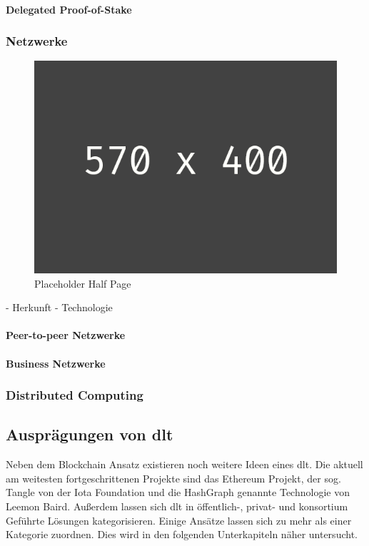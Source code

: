 \paragraph{Delegated Proof-of-Stake}


\subsubsection{Netzwerke}
\begin{figure}[h!]
	\centering
	\includegraphics[width=1.0\linewidth]{pictures/placeholder_half_page}
	\caption[Placeholder Half Page]{Placeholder Half Page}
	\label{fig:placeholder_half_page}
\end{figure}
- Herkunft
- Technologie

\paragraph{Peer-to-peer Netzwerke}

\paragraph{Business Netzwerke}

\subsubsection{Distributed Computing}


\subsection{Ausprägungen von \acl{dlt}}
Neben dem Blockchain Ansatz existieren noch weitere Ideen eines \ac{dlt}. Die aktuell am weitesten fortgeschrittenen Projekte sind das Ethereum Projekt, der sog. \glqq Tangle\grqq{} von der Iota Foundation und die \glqq HashGraph\grqq{} genannte Technologie von Leemon Baird.\cite{Baird2016} Außerdem lassen sich \ac{dlt} in öffentlich-, privat- und konsortium Geführte Lösungen kategorisieren. Einige Ansätze lassen sich zu mehr als einer Kategorie zuordnen. Dies wird in den folgenden Unterkapiteln näher untersucht.

